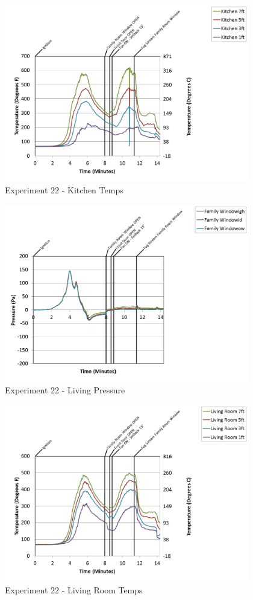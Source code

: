 \documentclass{article}
\begin{document}
\begin{appendices}
\clearpage

\begin{figure}[h!]
	\centering
	\includegraphics[height=3.05in]{0_Images/Results_Charts/Exp_22_Charts/KitchenTemps.png}
	\caption{Experiment 22 - Kitchen Temps}
\end{figure}


\begin{figure}[h!]
	\centering
	\includegraphics[height=3.05in]{0_Images/Results_Charts/Exp_22_Charts/LivingPressure.png}
	\caption{Experiment 22 - Living Pressure}
\end{figure}

\clearpage

\begin{figure}[h!]
	\centering
	\includegraphics[height=3.05in]{0_Images/Results_Charts/Exp_22_Charts/LivingRoomTemps.png}
	\caption{Experiment 22 - Living Room Temps}
\end{figure}



\end{appendices}
\end{document}
